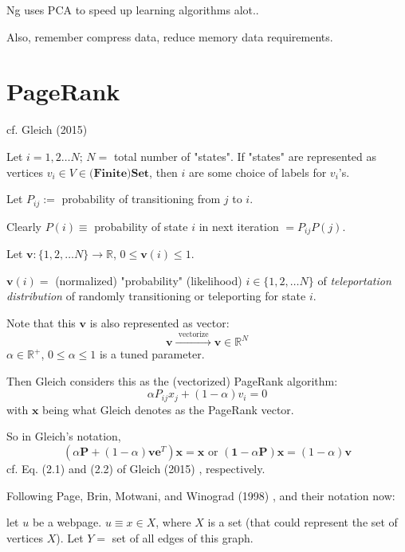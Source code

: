 \documentclass[10pt]{amsart}
\begin{document}
\begin{multicols*}{2}
Ng uses PCA to speed up learning algorithms alot..  

Also, remember compress data, reduce memory data requirements.  

\section{PageRank}  

cf. Gleich (2015) \cite{Glei2015}

Let $i=1,2\dots N$; $N=$ total number of "states".  If "states" are represented as vertices $v_i \in V \in \mathbf{\text{(Finite)Set}}$, then $i$ are some choice of labels for $v_i$'s.  

Let $P_{ij} :=$ probability of transitioning from $j$ to $i$.  

Clearly $P(i) \equiv $ probability of state $i$ in next iteration $=P_{ij}P(j)$.  

Let $\mathbf{v}:\lbrace 1,2, \dots N \rbrace \to \mathbb{R}$, $0\leq \mathbf{v}(i) \leq 1$.  

$\mathbf{v}(i) = $ (normalized) "probability" (likelihood) $i \in \lbrace 1,2, \dots N \rbrace$ of \emph{teleportation distribution} of randomly transitioning or teleporting for state $i$.  

Note that this $\mathbf{v}$ is also represented as vector:
\[
\mathbf{v} \xrightarrow{ \text{ vectorize } } \mathbf{v} \in \mathbb{R}^N
\]
$\alpha \in \mathbb{R}^+$, $0\leq \alpha \leq 1$ is a tuned parameter.  

Then Gleich considers this as the (vectorized) PageRank algorithm:
\begin{equation}
\alpha P_{ij}x_j + (1-\alpha) v_i =0 
\end{equation}
with $\mathbf{x}$ being what Gleich denotes as the PageRank vector.  

So in Gleich's notation, 
\begin{equation}
(\alpha \mathbf{P} + (1-\alpha)\mathbf{v} \mathbf{e}^T )\mathbf{x} = \mathbf{x}  \text{ or } ( \mathbf{1} - \alpha \mathbf{P}) \mathbf{x} = (1-\alpha) \mathbf{v}
\end{equation}
cf. Eq. (2.1) and (2.2) of Gleich (2015) \cite{Glei2015}, respectively.  

Following Page, Brin, Motwani, and Winograd (1998) \cite{PBMW1998}, and their notation now:

let $u$ be a webpage.  $u \equiv x \in X$, where $X$ is a set (that could represent the set of vertices $X$).  Let $Y = $ set of all edges of this graph.  


\end{multicols*}
\end{document}

